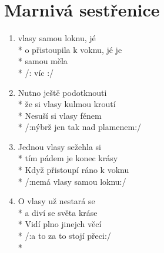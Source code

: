 \section{Marnivá sestřenice}
\begin{enumerate}
\item {} vlasy samou loknu, jé  \\*
o přistoupila k voknu, jé  je \\*
 samou  měla \\*
/:  víc  :/     
\item Nutno ještě podotknouti \\*
že si vlasy kulmou kroutí \\*
Nesuší si vlasy fénem \\*
/:nýbrž jen tak nad plamenem:/ 
\item Jednou vlasy sežehla si \\*
tím pádem je konec krásy \\*
Když přistoupí ráno k voknu \\*
/:nemá vlasy samou loknu:/ 
\item O vlasy už nestará se \\*
a diví se světa kráse \\*
Vidí plno jinejch věcí \\*
/:a to za to stojí přeci:/ \\*
\end{enumerate}
